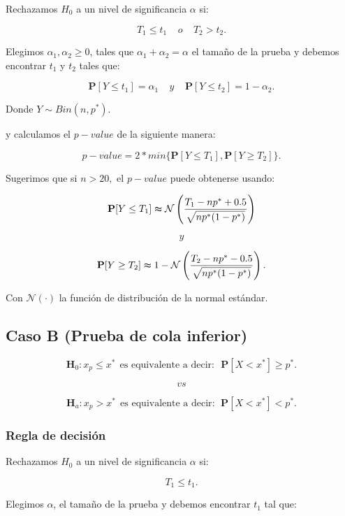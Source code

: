 \documentclass[
  a4paper,
  oneside,
  openany]{book}
\begin{document}
Rechazamos \(H_0\) a un nivel de significancia \(\alpha\) si:

\[T_{1}\leq t_{1} \ \ \ \ \  o   \ \ \ \ \ T_{2}>t_{2}.\]

Elegimos \(\alpha_{1},\alpha_{2}\geq 0\), tales que \(\alpha_{1}+\alpha_{2}=\alpha\) el tamaño de la prueba y debemos encontrar \(t_{1}\) y \(t_{2}\) tales que:

\[\mathbf{P}[Y \leq t_{1}]=\alpha_{1} \ \ \ \ \  y  \ \ \ \ \ \mathbf{P}[Y \leq t_{2}]=1-\alpha_{2}.\]

Donde \(Y \sim Bin (n,p^*)\).

y calculamos el \(p-value\) de la siguiente manera:

\[p-value=2*min \{ \mathbf{P}[Y\leq T_{1}],\mathbf{P}[Y \geq T_{2}] \}.\]

Sugerimos que si \(n > 20,\) el \(p-value\) puede obtenerse usando:

\[\mathbf{P}[Y\leq T_{1}] \thickapprox \mathcal{N}\left(\frac{T_{1}-np^*+0.5}{\sqrt{np^*(1-p^*)}}\right)\]

\[y\]

\[\mathbf{P}[Y\geq T_{2}] \thickapprox 1-\mathcal{N} \left(\frac{T_{2}-np^*-0.5}{\sqrt{np^*(1-p^*)}}\right).\]

Con \(\mathcal{N}(\cdot)\) la función de distribución de la normal estándar.

\hypertarget{caso-b-prueba-de-cola-inferior-1}{%
\subsection*{Caso B (Prueba de cola inferior)}\label{caso-b-prueba-de-cola-inferior-1}}


\[\textbf{H}_0: x_{p} \leq x^* \ \ \mbox{es equivalente a decir:} \ \ \ \mathbf{P}[X < x^*]\geq p^*.\]

\[vs\]

\[
\textbf{H}_a: x_{p} > x^* \ \  \mbox{es equivalente a decir}: \ \ \mathbf{P}[X < x^*]< p^*.
\]

\hypertarget{regla-de-decisiuxf3n-4}{%
\subsubsection*{Regla de decisión}\label{regla-de-decisiuxf3n-4}}


Rechazamos \(H_0\) a un nivel de significancia \(\alpha\) si:

\[T_{1} \leq t_{1}.\]

Elegimos \(\alpha\), el tamaño de la prueba y debemos encontrar \(t_{1}\) tal que:
\end{document}
